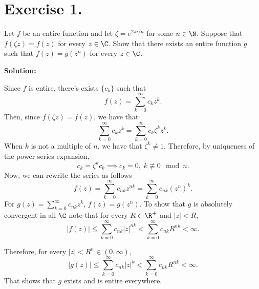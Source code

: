 \section*{Exercise 1.}

Let $f$ be an entire function and let $\zeta = e^{2\pi i / n}$ for some $n \in \N$. Suppose that $f(\zeta z) = f(z)$ for every $z \in\C$. Show that there exists an entire function $g$ such that $f(z) = g(z^n)$ for every $z\in \C$.

\textbf{Solution:}

Since $f$ is entire, there's exists $\{c_k\}$ such that 
\[ f(z) = \sum_{k = 0}^{\infty} c_k z^k. \]
Then, since $f(\zeta z) = f(z)$, we have that
\[ \sum_{k = 0}^{\infty} c_k z^k = \sum_{k = 0}^{\infty} c_k \zeta^k z^k. \]
When $k$ is not a multiple of $n$, we have that $\zeta^k \neq 1$. Therefore, by uniqueness of the power series expansion,
\[ c_k = \zeta^k c_k \implies c_k = 0,\; k\not\equiv 0 \mod n. \]
Now, we can rewrite the series as follows
\[ f(z) = \sum_{k = 0}^{\infty} c_{nk} z^{nk} = \sum_{k = 0}^{\infty} c_{nk} (z^{n})^k. \]
For $g(z) = \sum_{k = 0}^{\infty} c_{nk} z^k$, $f(z) = g(z^n)$. To show that $g$ is absolutely convergent in all $\C$ note that for every $R \in \R^+$ and $|z| < R$,
\[ |f(z)| \leq \sum_{k = 0}^{\infty} c_{nk} |z|^{nk} < \sum_{k = 0}^{\infty} c_{nk} R^{nk} < \infty. \]

Therefore, for every $|z| < R^n \in (0,\infty)$,
\[ |g(z)| \leq  \sum_{k = 0}^{\infty} c_{nk} |z|^{k} < \sum_{k = 0}^{\infty} c_{nk} R^{nk} < \infty. \]
That shows that $g$ exists and is entire everywhere.